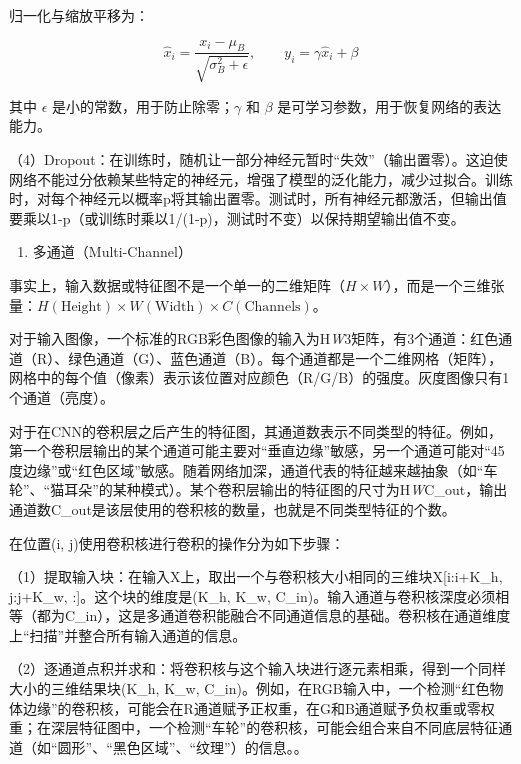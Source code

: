 归一化与缩放平移为：

\[
\hat{x}_i=\frac{x_i-\mu_B}{\sqrt{\sigma_B^2+\epsilon}},\qquad
y_i=\gamma\hat{x}_i+\beta
\]

其中 \(\epsilon\) 是小的常数，用于防止除零；\(\gamma\) 和 \(\beta\) 是可学习参数，用于恢复网络的表达能力。

（4）Dropout：在训练时，随机让一部分神经元暂时``失效''（输出置零）。这迫使网络不能过分依赖某些特定的神经元，增强了模型的泛化能力，减少过拟合。训练时，对每个神经元以概率p将其输出置零。测试时，所有神经元都激活，但输出值要乘以1-p（或训练时乘以1/(1-p)，测试时不变）以保持期望输出值不变。

\begin{enumerate}
\def\labelenumi{\arabic{enumi}.}
\setcounter{enumi}{5}
\tightlist
\item
  多通道（Multi-Channel）
\end{enumerate}

事实上，输入数据或特征图不是一个单一的二维矩阵（\(H \times W\)），而是一个三维张量：\(H(\mathrm{Height}) \times W(\mathrm{Width}) \times C(\mathrm{Channels})\)。

对于输入图像，一个标准的RGB彩色图像的输入为H\emph{W}3矩阵，有3个通道：红色通道（R）、绿色通道（G）、蓝色通道（B）。每个通道都是一个二维网格（矩阵），网格中的每个值（像素）表示该位置对应颜色（R/G/B）的强度。灰度图像只有1个通道（亮度）。

对于在CNN的卷积层之后产生的特征图，其通道数表示不同类型的特征。例如，第一个卷积层输出的某个通道可能主要对``垂直边缘''敏感，另一个通道可能对``45度边缘''或``红色区域''敏感。随着网络加深，通道代表的特征越来越抽象（如``车轮''、``猫耳朵''的某种模式）。某个卷积层输出的特征图的尺寸为H\emph{W}C\_out，输出通道数C\_out是该层使用的卷积核的数量，也就是不同类型特征的个数。

在位置(i, j)使用卷积核进行卷积的操作分为如下步骤：

（1）提取输入块：在输入X上，取出一个与卷积核大小相同的三维块X{[}i:i+K\_h, j:j+K\_w, :{]}。这个块的维度是(K\_h, K\_w, C\_in)。输入通道与卷积核深度必须相等（都为C\_in），这是多通道卷积能融合不同通道信息的基础。卷积核在通道维度上``扫描''并整合所有输入通道的信息。

（2）逐通道点积并求和：将卷积核与这个输入块进行逐元素相乘，得到一个同样大小的三维结果块(K\_h, K\_w, C\_in)。例如，在RGB输入中，一个检测``红色物体边缘''的卷积核，可能会在R通道赋予正权重，在G和B通道赋予负权重或零权重；在深层特征图中，一个检测``车轮''的卷积核，可能会组合来自不同底层特征通道（如``圆形''、``黑色区域''、``纹理''）的信息。。

